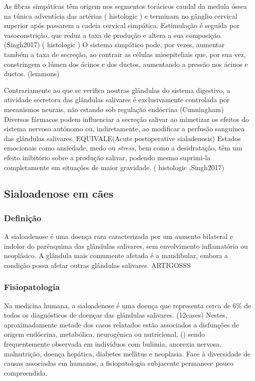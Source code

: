 As fibras simpáticas têm origem nos segmentos torácicos caudal da medula óssea na túnica adventícia das artérias (\cite{Poirier2018} histologic \cite{Bae2024}) e terminam no gânglio cervical superior após passarem a cadeia cervical simpática. Estimulação é seguida por vasoconstrição, que reduz a taxa de produção e altera a sua composição. (Singh2017) (\cite{Poirier2018} histologic \cite{Bae2024}) O sistema simpático pode, por vezes, aumentar também a taxa de secreção, ao contrair as células mioepiteliais que, por sua vez, constringem o lúmen dos ácinos e dos ductos, aumentando a pressão nos ácinos e ductos. (lemmons)


Contrariamente ao que se verifica noutras glândulas do sistema digestivo, a atividade secretora das glândulas salivares é exclusivamente controlada por mecanismos neurais, não estando sob regulação endócrina (Cunningham) Diversos fármacos podem influenciar a secreção salivar ao mimetizar os efeitos do sistema nervoso autónomo ou, indiretamente, ao modificar a perfusão sanguínea das glândulas salivares. \cite{Cattai2016} EQUIVALE(Acute postoperative sialadenosis) Estados emocionais como ansiedade, medo ou \textit{stress}, bem como a desidratação, têm um efeito inibitório sobre a produção salivar, podendo mesmo suprimi-la completamente em situações de maior gravidade. (\cite{Poirier2018} histologic \cite{Bae2024},Singh2017) 


\subsection{Sialoadenose em cães}

\subsubsection{Definição}

A sialoadenose é uma doença rara caracterizada por um aumento bilateral e indolor do parênquima das glândulas salivares, sem envolvimento inflamatório ou neoplásico. A glândula mais comumente afetada é a mandibular, embora a condição possa afetar outras glândulas salivares. ARTIGOSSS

\subsubsection{Fisiopatologia}

Na medicina humana, a sialoadenose é uma doença que representa cerca de 6\% de todos os diagnósticos de doenças das glândulas salivares. (12cases) Nestes, aproximadamente metade dos casos relatados estão associados a disfunções de origem endócrina, metabólica, neurogénica ou nutricional, (\cite{Trinka2023}) sendo frequentemente observada em indivíduos com bulimia, anorexia nervosa, malnutrição, doença hepática, diabetes mellitus e neoplasia. \cite{Alcoverro2014} Face à diversidade de causas associadas em humanos, a fisiopatologia subjacente permanece pouco compreendida. \cite{Ide2011}


